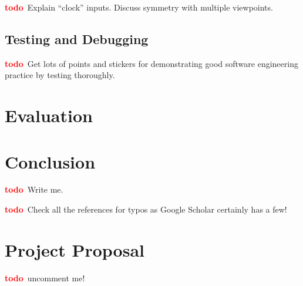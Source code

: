 \documentclass[12pt,a4paper,twoside,openright]{report}
\newcommand{\todo}{\textcolor{red}{\textbf{todo}~}}
\begin{document}
\todo Explain ``clock'' inputs. Discuss symmetry with multiple viewpoints.

\section{Testing and Debugging}

\todo Get lots of points and stickers for demonstrating good software
engineering practice by testing thoroughly.

\chapter{Evaluation}\label{chap:eval}


\chapter{Conclusion}

\todo Write me.

\printbibliography
{}
\todo Check all the references for typos as Google Scholar certainly has a few!

\appendix

\chapter{Project Proposal}

\todo uncomment me!
%
\end{document}
